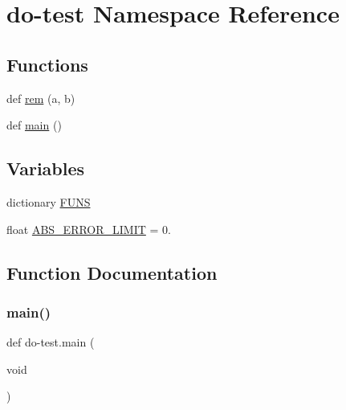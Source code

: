 \hypertarget{namespacedo-test}{}\section{do-\/test Namespace Reference}
\label{namespacedo-test}
\subsection*{Functions}
\begin{DoxyCompactItemize}
\item 
def \hyperlink{namespacedo-test_a1bdebfddd94ff5d15dccfe8c3da367f5}{rem} (a, b)
\item 
def \hyperlink{namespacedo-test_a3d4b60fc9b49e58d077e4c036a5f63c0}{main} ()
\end{DoxyCompactItemize}
\subsection*{Variables}
\begin{DoxyCompactItemize}
\item 
dictionary \hyperlink{namespacedo-test_ab5e68cf19230fadc42ed194f1f1e1360}{F\+U\+NS}
\item 
float \hyperlink{namespacedo-test_a9b7b485f0539fe63325f679d351ef485}{A\+B\+S\+\_\+\+E\+R\+R\+O\+R\+\_\+\+L\+I\+M\+IT} = 0.
\end{DoxyCompactItemize}


\subsection{Function Documentation}
\mbox{\label{namespacedo-test_a3d4b60fc9b49e58d077e4c036a5f63c0}} 
\subsubsection{\texorpdfstring{main()}{main()}}
{\footnotesize\ttfamily def do-\/test.\+main (\begin{DoxyParamCaption}\item[{void}]{ }\end{DoxyParamCaption})}

\mbox{\label{namespacedo-test_a1bdebfddd94ff5d15dccfe8c3da367f5}} 

